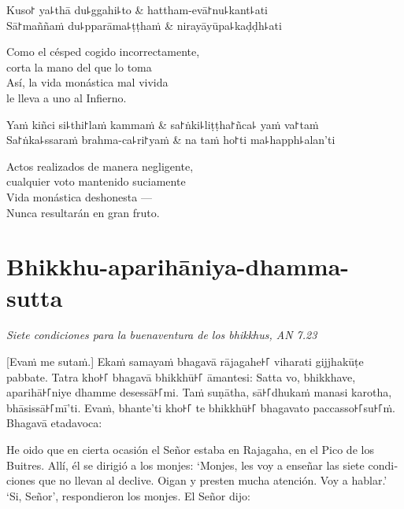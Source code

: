 \clearpage

\begin{twochants}
	Kuso꜓ ya꜕thā du꜕ggahi꜕to & hattham-evā꜓nu꜕kant꜕ati \\
	Sā꜓maññaṁ du꜕pparāma꜕ṭṭhaṁ & nirayāyūpa꜕kaḍḍh꜕ati \\
\end{twochants}

\begin{english}
	Como el césped cogido incorrectamente,\\
	corta la mano del que lo toma\\
	Así, la vida monástica mal vivida\\
	le lleva a uno al Infierno.
\end{english}

\begin{twochants}
	Yaṁ kiñci si꜕thi꜓laṁ kammaṁ & sa꜓ṅki꜕liṭṭha꜓ñca꜕ yaṁ va꜓taṁ \\
	Sa꜓ṅka꜕ssaraṁ brahma-ca꜕ri꜓yaṁ & na taṁ ho꜓ti ma꜕happh꜕alan'ti \\
\end{twochants}

\begin{english}
	Actos realizados de manera negligente,\\
	cualquier voto mantenido suciamente\\
	Vida monástica deshonesta ---\\
	Nunca resultarán en gran fruto.
\end{english}

\chapter[Aparihāniya-dhamma-sutta]{Bhikkhu-aparihāniya-dhamma-sutta}

\emph{Siete condiciones para la buenaventura de los bhikkhus, AN 7.23}

\begin{leader}
\end{leader}

[Evaṁ me sutaṁ.] Ekaṁ samayaṁ bhagavā rājagahe꜔꜒ viharati gijjhakūṭe pabbate.
Tatra kho꜔꜒ bhagavā bhikkhū꜔꜒ āmantesi: Satta vo, bhikkhave, aparihā꜔꜒niye dhamme
desessā꜔꜒mi. Taṁ suṇātha, sā꜔꜒dhukaṁ manasi karotha, bhāsissā꜔꜒mī'ti. Evaṁ, bhante'ti
kho꜔꜒ te bhikkhū꜔꜒ bhagavato paccasso꜔꜒su꜔꜒ṁ. Bhagavā etadavoca:

\begin{english}
  He oido que en cierta ocasión el Señor estaba en Rajagaha, en el Pico de los
  Buitres. Allí, él se dirigió a los monjes: `Monjes, les voy a enseñar las siete
  condiciones que no llevan al declive. Oigan y presten mucha atención. Voy
  a hablar.' `Si, Señor', respondieron los monjes. El Señor dijo:
\end{english}

